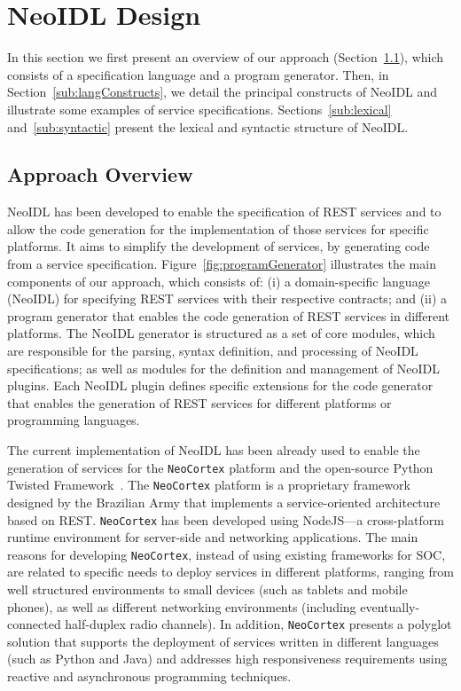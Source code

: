 \documentclass{ws-ijseke}
\newcommand{\neoidl}{NeoIDL}
\newcommand{\neocortex}{\texttt{NeoCortex}}
\begin{document}
\section{NeoIDL Design}\label{sec:design}

In this section we first present an overview of our approach (Section~\ref{sub:approachOverview}), which
consists of a specification language and a program generator. Then, in
Section~\ref{sub:langConstructs}, we detail the principal constructs of \neoidl{} and
illustrate some examples of service specifications. Sections~\ref{sub:lexical} and~\ref{sub:syntactic} present 
the lexical and syntactic structure of \neoidl. 

\subsection{Approach Overview}\label{sub:approachOverview}

NeoIDL has been developed to enable the specification of REST 
services and to allow the code generation for the implementation 
of those services for specific platforms.
It aims to simplify the development of
services, by generating code from a
service specification. Figure~\ref{fig:programGenerator} illustrates
the main components of our approach, which consists
of: (i) a domain-specific language (\neoidl)
for specifying REST services with their respective
contracts; and (ii) a
program generator that enables the code generation of REST services
in different platforms. 
The \neoidl{} generator is structured as a set of
core modules, which are responsible for the parsing,
syntax definition, and processing of \neoidl{} specifications;
as well as modules for the definition and
management of \neoidl{} plugins. Each \neoidl{} plugin
defines specific extensions for the code generator
that enables the generation of REST services for different platforms
or programming languages.

The current implementation of \neoidl{} has been already used
to enable the generation of services for the \neocortex{} platform and the open-source 
Python Twisted Framework~\cite{twisted:book}. The \neocortex{} platform is 
a proprietary framework designed by the Brazilian Army that implements 
a service-oriented architecture based on
REST. \neocortex{} has been developed using  NodeJS---a cross-platform
runtime environment for server-side and networking applications.
The main reasons for
developing \neocortex{}, instead of using existing frameworks for 
SOC, are related to specific needs to deploy services in
different platforms, ranging from well structured environments to
small devices (such as tablets and mobile phones), as well as different
networking environments (including eventually-connected half-duplex
radio channels). In addition,
\neocortex{} presents a polyglot solution that supports 
the deployment of services written in different languages (such as
Python and Java) and addresses high responsiveness requirements using
reactive and asynchronous programming techniques. 
\end{document}
